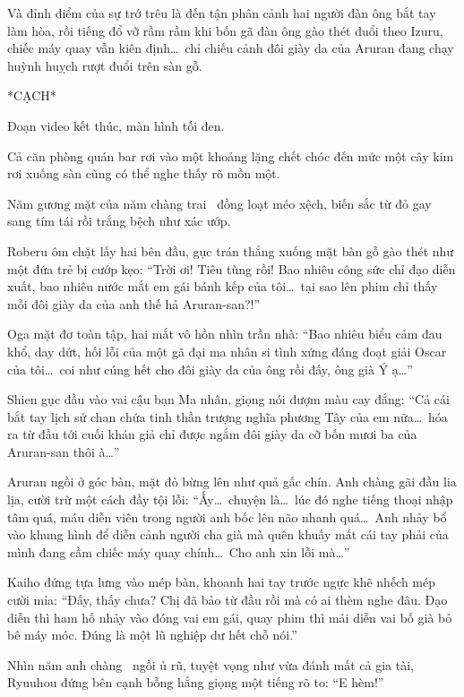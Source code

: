 \documentclass[../main.tex]{subfiles}
\begin{document}
Và đỉnh điểm của sự trớ trêu là đến tận phân cảnh hai người đàn ông bắt tay làm hòa, rồi tiếng đổ vỡ rầm rầm khi bốn gã đàn ông gào thét đuổi theo Izuru, chiếc máy quay vẫn kiên định\dots\ chỉ chiếu cảnh đôi giày da của Aruran đang chạy huỳnh huỵch rượt đuổi trên sàn gỗ.

*CẠCH*

Đoạn video kết thúc, màn hình tối đen.

Cả căn phòng quán bar rơi vào một khoảng lặng chết chóc đến mức một cây kim rơi xuống sàn cũng có thể nghe thấy rõ mồn một.

Năm gương mặt của năm chàng trai \hls\ đồng loạt méo xệch, biến sắc từ đỏ gay sang tím tái rồi trắng bệch như xác ướp.


Roberu ôm chặt lấy hai bên đầu, gục trán thẳng xuống mặt bàn gỗ gào thét như một đứa trẻ bị cướp kẹo: ``Trời ơi! Tiêu tùng rồi! Bao nhiêu công sức chỉ đạo diễn xuất, bao nhiêu nước mắt em gái bánh kếp của tôi\dots\ tại sao lên phim chỉ thấy mỗi đôi giày da của anh thế hả Aruran-san?!''

Oga mặt đơ toàn tập, hai mắt vô hồn nhìn trần nhà: ``Bao nhiêu biểu cảm đau khổ, day dứt, hối lỗi của một gã đại ma nhân si tình xứng đáng đoạt giải Oscar của tôi\dots\ coi như cúng hết cho đôi giày da của ông rồi đấy, ông già Ý ạ\dots''

Shien gục đầu vào vai cậu bạn Ma nhân, giọng nói đượm màu cay đắng: ``Cả cái bắt tay lịch sử chan chứa tinh thần trượng nghĩa phương Tây của em nữa\dots\ hóa ra từ đầu tới cuối khán giả chỉ được ngắm đôi giày da cỡ bốn mươi ba của Aruran-san thôi à\dots''

Aruran ngồi ở góc bàn, mặt đỏ bừng lên như quả gấc chín. Anh chàng gãi đầu lia lịa, cười trừ một cách đầy tội lỗi: ``Ấy\dots\ chuyện là\dots\ lúc đó nghe tiếng thoại nhập tâm quá, máu diễn viên trong người anh bốc lên não nhanh quá\dots\ Anh nhảy bổ vào khung hình để diễn cảnh người cha già mà quên khuấy mất cái tay phải của mình đang cầm chiếc máy quay chính\dots\ Cho anh xin lỗi mà\dots''

Kaiho đứng tựa lưng vào mép bàn, khoanh hai tay trước ngực khẽ nhếch mép cười mỉa: ``Đấy, thấy chưa? Chị đã bảo từ đầu rồi mà có ai thèm nghe đâu. Đạo diễn thì ham hố nhảy vào đóng vai em gái, quay phim thì mải diễn vai bố già bỏ bê máy móc. Đúng là một lũ nghiệp dư hết chỗ nói.''

Nhìn năm anh chàng \hls\ ngồi ủ rũ, tuyệt vọng như vừa đánh mất cả gia tài, Ryuuhou đứng bên cạnh bỗng hắng giọng một tiếng rõ to: ``E hèm!''
\end{document}
